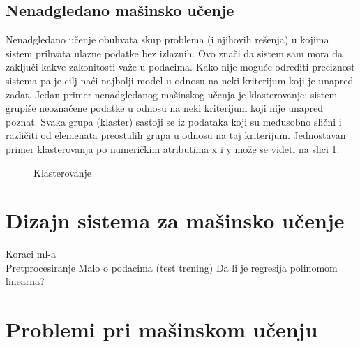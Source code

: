 \subsection{Nenadgledano mašinsko učenje}

Nenadgledano učenje obuhvata skup problema (i njihovih rešenja) u kojima sistem prihvata ulazne podatke bez izlaznih. Ovo znači da sistem sam mora da zaključi kakve zakonitosti važe u podacima.  Kako nije moguće odrediti preciznost sistema pa je cilj naći najbolji model u odnosu na neki kriterijum koji je unapred zadat.
Jedan primer nenadgledanog mašinskog učenja je klasterovanje: sistem grupiše neoznačene podatke u odnosu na  neki kriterijum koji nije unapred poznat. Svaka grupa (klaster) sastoji se iz podataka koji su međusobno slični i različiti od elemenata preostalih grupa u odnosu na taj kriterijum. Jednostavan primer klasterovanja po numeričkim atributima x i y može se videti na slici \ref{fig:klaster}.
	
\begin{figure}
	\centering
	\resizebox{.8\linewidth}{!}{}
	\caption{Klasterovanje}
	\label{fig:klaster}
\end{figure}

\section{Dizajn sistema za mašinsko učenje}
Koraci ml-a \\
Pretprocesiranje
Malo o podacima (test trening)
Da li je regresija polinomom linearna?

\section{Problemi pri mašinskom učenju}


